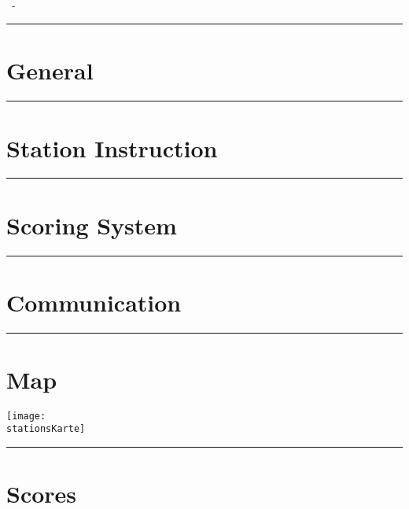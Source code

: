 \documentclass{scrartcl}
\begin{document}
	\ \\
	\Huge{\stationsNummer \ -  \stationsName}
	\normalsize 
	\ \\
	\noindent\rule{\textwidth}{0.2pt}
	\section*{General}
	
	\noindent\rule{\textwidth}{0.2pt}
	\section*{Station Instruction}
	
	\noindent\rule{\textwidth}{0.2pt}
	\section*{Scoring System}
	
	\noindent\rule{\textwidth}{0.2pt}
	\section*{Communication}
	
	\noindent\rule{\textwidth}{0.2pt}
	\section*{Map}
		\begin{center}
			\texttt{[image: \\stationsKarte]}
		\end{center}
	
	\noindent\rule{\textwidth}{0.2pt}

	\newpage
	
	\section*{Scores}
	\begin{multicols}{3}

    \begin{enumerate}
    \end{enumerate}
       

	\end{multicols}
\end{document}
